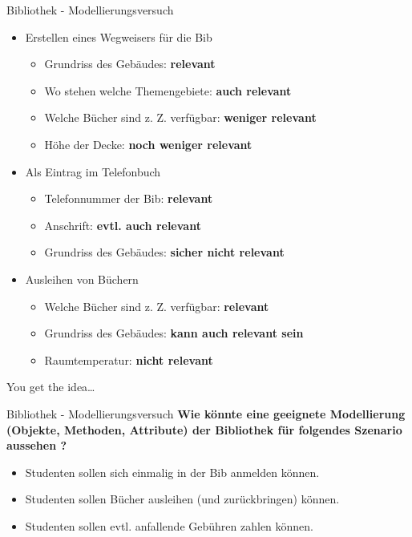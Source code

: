 \documentclass[18pt]{beamer}
\begin{document}
\begin{frame}{Bibliothek - Modellierungsversuch}
    \begin{itemize}
        \item Erstellen eines Wegweisers für die Bib
        \begin{itemize}
            \item Grundriss des Gebäudes: \textbf{relevant}
            \item Wo stehen welche Themengebiete: \textbf{auch relevant}
            \item Welche Bücher sind z. Z. verfügbar: \textbf{weniger relevant}
            \item Höhe der Decke: \textbf{noch weniger relevant}
        \end{itemize}
        \pause
        \item Als Eintrag im Telefonbuch
        \begin{itemize}
            \item Telefonnummer der Bib: \textbf{relevant}
            \item Anschrift: \textbf{evtl. auch relevant}
            \item Grundriss des Gebäudes: \textbf{sicher nicht relevant}
        \end{itemize}
        \pause
        \item Ausleihen von Büchern
        \begin{itemize}
            \item Welche Bücher sind z. Z. verfügbar: \textbf{relevant}
            \item Grundriss des Gebäudes: \textbf{kann auch relevant sein}
            \item Raumtemperatur: \textbf{nicht relevant}
        \end{itemize}
    \end{itemize}
    You get the idea\dots
\end{frame}

\begin{frame}{Bibliothek - Modellierungsversuch}
    \textbf{Wie könnte eine geeignete Modellierung (Objekte, Methoden, Attribute) der \textbf{Bibliothek} für folgendes Szenario aussehen ?}
    \begin{itemize}
        \item Studenten sollen sich einmalig in der Bib anmelden können.
        \item Studenten sollen Bücher ausleihen (und zurückbringen) können.
        \item Studenten sollen evtl. anfallende Gebühren zahlen können.
    \end{itemize}
\end{frame}
\end{document}
